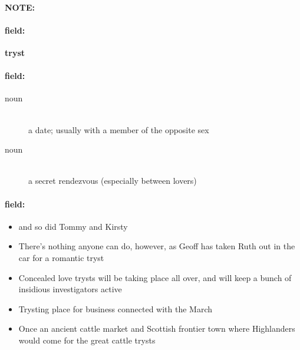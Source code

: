 \documentclass[12pt]{article}
\newenvironment{note}{\paragraph{NOTE:}}{}
\newenvironment{field}{\paragraph{field:}}{}
\begin{document}
\begin{note}
\begin{field}
\textbf{\large tryst}
\end{field}


\begin{field}
\begin{description}
\item[noun] \hfill \\ 
a date; usually with a member of the opposite sex

\item[noun] \hfill \\ 
a secret rendezvous (especially between lovers)

\end{description}
\end{field}

\begin{field}
\begin{itemize}
\item  and so did Tommy and Kirsty
\item There's nothing anyone can do, however, as Geoff has taken Ruth out in the car for a romantic tryst
\item Concealed love trysts will be taking place all over, and will keep a bunch of insidious investigators active
\item Trysting place for business connected with the March
\item Once an ancient cattle market and Scottish frontier town where Highlanders would come for the great cattle trysts
\end{itemize}
\end{field}
\end{note}
\end{document}
